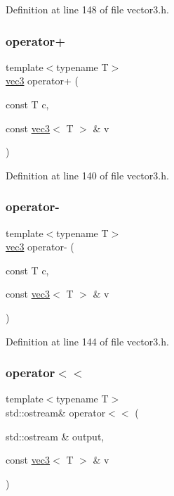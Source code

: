 Definition at line 148 of file vector3.\+h.

\mbox{\label{structvec3_a04165a00cae4ce5d2f5e142cc177a720}} 
\subsubsection{\texorpdfstring{operator+}{operator+}}
{\footnotesize\ttfamily template$<$typename T$>$ \\
\mbox{\hyperlink{structvec3}{vec3}} operator+ (\begin{DoxyParamCaption}\item[{const T}]{c,  }\item[{const \mbox{\hyperlink{structvec3}{vec3}}$<$ T $>$ \&}]{v }\end{DoxyParamCaption})\hspace{0.3cm}{\ttfamily [friend]}}



Definition at line 140 of file vector3.\+h.

\mbox{\label{structvec3_a6252e85a538cca25b99107166be778b1}} 
\subsubsection{\texorpdfstring{operator-\/}{operator-}}
{\footnotesize\ttfamily template$<$typename T$>$ \\
\mbox{\hyperlink{structvec3}{vec3}} operator-\/ (\begin{DoxyParamCaption}\item[{const T}]{c,  }\item[{const \mbox{\hyperlink{structvec3}{vec3}}$<$ T $>$ \&}]{v }\end{DoxyParamCaption})\hspace{0.3cm}{\ttfamily [friend]}}



Definition at line 144 of file vector3.\+h.

\mbox{\label{structvec3_af5e1bcad9d3d484d6f4e6b3f8949f5cf}} 
\subsubsection{\texorpdfstring{operator$<$$<$}{operator<<}}
{\footnotesize\ttfamily template$<$typename T$>$ \\
std\+::ostream\& operator$<$$<$ (\begin{DoxyParamCaption}\item[{std\+::ostream \&}]{output,  }\item[{const \mbox{\hyperlink{structvec3}{vec3}}$<$ T $>$ \&}]{v }\end{DoxyParamCaption})\hspace{0.3cm}{\ttfamily [friend]}}



